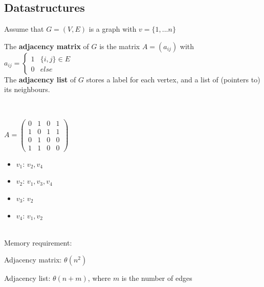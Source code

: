 \subsection{Datastructures}

Assume that $G=(V,E)$ is a graph with $v=\{1,...n\}$
\vspace{0.5cm}
\begin{definition}\label{1.18}
    The \textbf{adjacency matrix} of $G$ is the matrix $A=(a_{ij})$ with $a_{ij}=\begin{cases}
            1 & \{i,j\}\in E \\
            0 & else
            \end{cases}$\\
    The \textbf{adjacency list} of $G$ stores a label for each vertex, and a list of (pointers to) its neighbours.
\end{definition}
\begin{example}\label{1.19}
\hfill \\
        \begin{center}
        \end{center}
        $A=
        \begin{pmatrix}
        0 & 1 & 0 & 1 \\
        1 & 0 & 1 & 1 \\
        0 & 1 & 0 & 0 \\
        1 & 1 & 0 & 0
        \end{pmatrix}$
        \begin{itemize}
            \item $v_1$: $v_2, v_4$
            \item $v_2$: $v_1, v_3, v_4$
            \item $v_3$: $v_2$
            \item $v_4$: $v_1, v_2$
        \end{itemize}
\end{example}
\vspace{0.5cm}

\begin{remark}\label{1.20}
\hfill \\
    Memory requirement: \par
    Adjacency matrix: $\theta (n^2)$\par
    Adjacency list: $\theta (n+m)$, where $m$ is the number of edges
\end{remark}